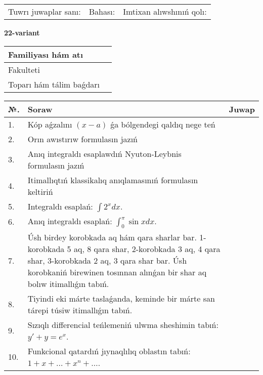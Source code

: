 \documentclass{article}
\begin{document}
\vspace{1cm}

\begin{tabular}{ c c c }
Tuwrı juwaplar sanı: \underline{\hspace{2cm}} & Bahası: \underline{\hspace{2cm}} & Imtixan alıwshınıń qolı: \underline{\hspace{2cm}} \\
\end{tabular}

\newpage

\begin{center}\textbf{22-variant}\end{center}

\bgroup
\def\arraystretch{1.5}
\begin{tabular}{ |m{6cm}|m{10cm}| }
  \hline
  Familiyası hám atı & \\
  \hline
  Fakulteti &\\
  \hline
  Toparı hám tálim baǵdarı & \\
  \hline
\end{tabular}
\egroup

\vspace{0.5cm}

\bgroup
\def\arraystretch{2}
\begin{tabular}{ |l|m{8cm}|m{7cm}| }
  \hline
  №. & Soraw & Juwap \\
  \hline
  1. & Kóp aǵzalını $(x - a)$ ǵa bólgendegi qaldıq nege teń &  \\
  \hline
  2. & Orın awıstırıw formulasın jazıń &  \\
  \hline
  3. & Anıq integraldı esaplawdıń Nyuton-Leybnis formulasın jazıń &  \\
  \hline
  4. & Itimallıqtıń klassikalıq anıqlamasınıń formulasın keltiriń &  \\
  \hline
  5. & Integraldı esaplań: $\displaystyle\int {2^{x}dx} $. &  \\
  \hline
  6. & Anıq integraldı esaplań: $\displaystyle\int_{0}^{\pi}\sin xdx$. &  \\
  \hline
  7. & Úsh birdey korobkada aq hám qara sharlar bar. 1-korobkada 5 aq, 8 qara shar, 2-korobkada 3 aq, 4 qara shar, 3-korobkada 2 aq, 3 qara shar bar. Úsh korobkaniń birewinen tosınnan alınǵan bir shar aq bolıw itimallıǵın tabıń. &  \\
  \hline
  8. & Tiyindi eki márte taslaǵanda, keminde bir márte san tárepi túsiw itimallıǵın tabıń. &  \\
  \hline
  9. & Sızıqlı differencial teńlemeniń ulwma sheshimin tabıń: $y' + y =e^{x}$. &  \\
  \hline
  10. & Funkcional qatardıń jıynaqlılıq oblastın tabıń: $1 + x + \ldots + x^{n} + \ldots$. &  \\
  \hline
\end{tabular}
\egroup
\end{document}
